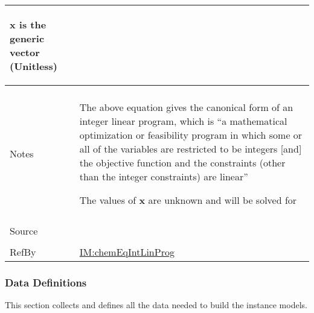 \documentclass[12pt]{article}
\begin{document}
\begin{minipage}{\textwidth}
\begin{tabular}{>{\raggedright}p{}>{\raggedright\arraybackslash}p{}}
              \begin{symbDescription}
              \item{$\symbf{x}$ is the generic vector (Unitless)}
              \end{symbDescription}
\\ \midrule \\
Notes & The above equation gives the canonical form of an integer linear program, which is ``a mathematical optimization or feasibility program in which some or all of the variables are restricted to be integers [and] the objective function and the constraints (other than the integer constraints) are linear'' \cite{ilpWiki}
        
        The values of $\symbf{x}$ are unknown and will be solved for
        
\\ \midrule \\
Source & \cite{ilpWiki}
         
\\ \midrule \\
RefBy & \hyperref[IM:chemEqIntLinProg]{IM:chemEqIntLinProg}
        
\\ \bottomrule
\end{tabular}
\end{minipage}
\subsubsection{Data Definitions}
\label{Sec:DDs}
This section collects and defines all the data needed to build the instance models.
\end{document}
